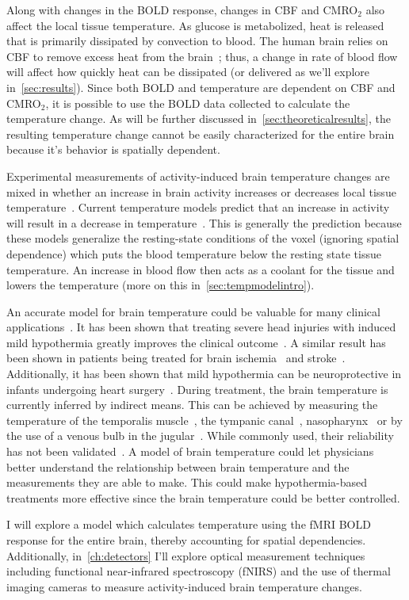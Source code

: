 Along with changes in the BOLD response, changes in CBF and CMRO$_2$ also affect the local tissue temperature. As glucose is metabolized, heat is released that is primarily dissipated by convection to blood.  The human brain relies on CBF to remove excess heat from the brain~\citep{karbowski2009}; thus, a change in rate of blood flow will affect how quickly heat can be dissipated (or delivered as we'll explore in~\cref{sec:results}).  Since both BOLD and temperature are dependent on CBF and CMRO$_2$, it is possible to use the BOLD data collected to calculate the temperature change. As will be further discussed in~\cref{sec:theoreticalresults}, the resulting temperature change cannot be easily characterized for the entire brain because it's behavior is spatially dependent.

Experimental measurements of activity-induced brain temperature changes are mixed in whether an increase in brain activity increases or decreases local tissue temperature~\citep{mcelligott,kiyatkin,zeschke,george,tachibana}. Current temperature models predict that an increase in activity will result in a decrease in temperature~\citep{sotero2011,yablonskiy,trubel}.  This is generally the prediction because these models generalize the resting-state conditions of the voxel (ignoring spatial dependence) which puts the blood temperature below the resting state tissue temperature.  An increase in blood flow then acts as a coolant for the tissue and lowers the temperature (more on this in~\cref{sec:tempmodelintro}).

An accurate model for brain temperature could be valuable for many clinical applications~\citep{bertolizio2011}.  It has been shown that treating severe head injuries with induced mild hypothermia greatly improves the clinical outcome~\citep{soukup2002}.  A similar result has been shown in patients being treated for brain ischemia~\citep{maher1993,ginsberg1992} and stroke~\citep{krieger2001}.  Additionally, it has been shown that mild hypothermia can be neuroprotective in infants undergoing heart surgery~\citep{dominguez2003}. During treatment, the brain temperature is currently inferred by indirect means.  This can be achieved by measuring the temperature of the temporalis muscle~\citep{suehiro2003}, the tympanic canal~\citep{baker1972,shiraki1988}, nasopharynx~\citep{stecker2001} or by the use of a venous bulb in the jugular~\citep{rumana1998,bissonnette2000}. While commonly used, their reliability has not been validated~\citep{shiraki1988,bissonnette2000}. A model of brain temperature could let physicians better understand the relationship between brain temperature and the measurements they are able to make. This could make hypothermia-based treatments more effective since the brain temperature could be better controlled.

I will explore a model which calculates temperature using the fMRI BOLD response for the entire brain, thereby accounting for spatial dependencies.  Additionally, in~\cref{ch:detectors} I'll explore optical measurement techniques including functional near-infrared spectroscopy (fNIRS) and the use of thermal imaging cameras to measure activity-induced brain temperature changes.